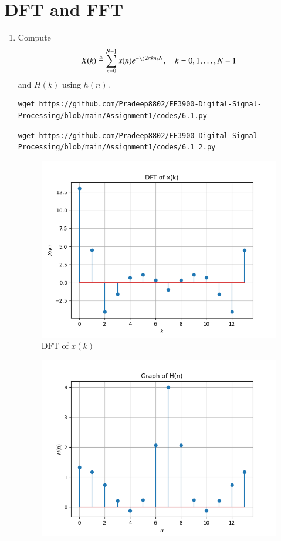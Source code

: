 \documentclass[journal,12pt,twocolumn]{IEEEtran}
\renewcommand\thesection{\arabic{section}}
\begin{document}
\section{DFT and FFT}
\begin{enumerate}[label=\thesection.\arabic*]
\item
Compute
\begin{equation}
X(k) \define \sum _{n=0}^{N-1}x(n) e^{-\j2\pi kn/N}, \quad k = 0,1,\dots, N-1
\end{equation}
and $H(k)$ using $h(n)$.\\
\solution \begin{lstlisting}
wget https://github.com/Pradeep8802/EE3900-Digital-Signal-Processing/blob/main/Assignment1/codes/6.1.py
\end{lstlisting}
\begin{lstlisting}
wget https://github.com/Pradeep8802/EE3900-Digital-Signal-Processing/blob/main/Assignment1/codes/6.1_2.py
\end{lstlisting}
\begin{figure}[!ht]
	\centering
	\includegraphics[width=\columnwidth]{./figs/6.1_1.png}
	\caption{DFT of $x(k)$}
	\label{fig:6.1_1}
\end{figure}
\begin{figure}[!ht]
	\centering
	\includegraphics[width=\columnwidth]{./figs/6.1_2.png}

\end{figure}
\end{enumerate}
\end{document}
